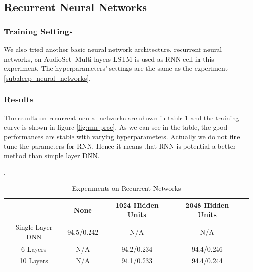 \documentclass{article}
\begin{document}
		\subsection{Recurrent Neural Networks}
			\subsubsection*{Training Settings}
				We also tried another basic neural network architecture, recurrent neural networks, on AudioSet. Multi-layers LSTM \cite{DBLP:journals/corr/SakSB14} is used as RNN cell in this experiment. The hyperparameters' settings are the same as the experiment \ref{sub:deep_neural_networks}.

			\subsubsection*{Results}
				The results on recurrent neural networks are shown in table \ref{table:rnn-res} and the training curve is shown in figure \ref{fig:rnn-proc}. As we can see in the table, the good performances are stable with varying hyperparameters. Actually we do not fine tune the parameters for RNN. Hence it means that RNN is potential a better method than simple layer DNN.
				\begin{table}[htbp]. 
					\centering
					\begin{tabular}{c|cccc}
						\hline
						\hline
						                  & None & 1024 Hidden Units & 2048 Hidden Units\\
						\hline
						Single Layer DNN & 94.5/0.242 & N/A & N/A \\
						6 Layers       & N/A & 94.2/0.234 & 94.4/0.246 \\
						10 Layers      & N/A & 94.1/0.233 & 94.4/0.244 \\
						\hline
					\end{tabular}
					\caption{\label{table:rnn-res}Experiments on Recurrent Networks}
				\end{table}
\end{document}
